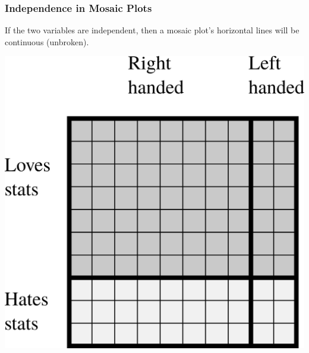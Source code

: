 \begin{frame}
\frametitle{Independence in Mosaic Plots}

If the two variables are independent, then a mosaic plot's horizontal lines will be continuous (unbroken).
\begin{center}
\includegraphics[scale=0.3]{1-7_categorical_data/figures/mosaic/handed.png}
\end{center}


\end{frame}








